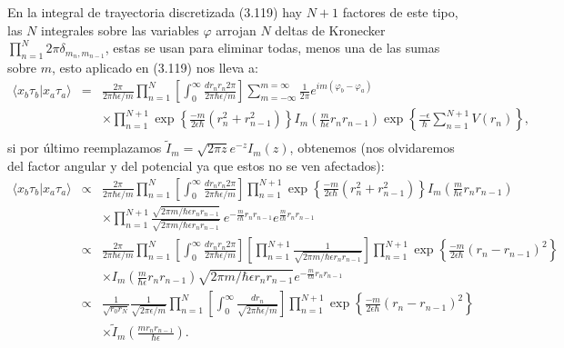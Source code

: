 En la integral de trayectoria discretizada (3.119) hay $N+1$ factores de este tipo, las $N$ integrales sobre las variables $\varphi$ arrojan $N$ deltas de Kronecker $\prod_{n=1}^{N}2\pi\delta_{m_{n},m_{n-1}}$, estas se usan para eliminar todas, menos una de las sumas sobre $m$, esto aplicado en (3.119) nos lleva a: 
\begin{eqnarray}
\nonumber \langle x_{b}\tau_{b}|x_{a}\tau_{a}\rangle &=&\frac{2\pi}{2\pi\hbar\epsilon/m}\prod_{n=1}^{N}\left[\int_{0}^{\infty}\frac{dr_{n}r_{n}2\pi}{2\pi\hbar\epsilon/m}\right]\sum_{m=-\infty}^{m=\infty}\frac{1}{2\pi}e^{im(\varphi_{b}-\varphi_{a})}\\
\nonumber && \times \prod_{n=1}^{N+1}\exp\left\{ \frac{-m}{2\epsilon\hbar}(r_{n}^{2}+r_{n-1}^{2})\right\} I_{m}\left(\frac{m}{\hbar\epsilon}r_{n}r_{n-1}\right)\exp\left\{ \frac{-\epsilon}{\hbar}\sum_{n=1}^{N+1}V(r_{n})\right\},\\ 
\end{eqnarray}
si por último reemplazamos $\tilde{I}_m=\sqrt{2\pi z}e^{-z}I_m(z)$, obtenemos (nos olvidaremos del factor angular y del potencial ya que estos no se ven afectados):
\begin{eqnarray}
\nonumber \langle x_{b}\tau_{b}|x_{a}\tau_{a}\rangle &\propto &\frac{2\pi}{2\pi\hbar\epsilon/m}\prod_{n=1}^{N}\left[\int_{0}^{\infty}\frac{dr_{n}r_{n}2\pi}{2\pi\hbar\epsilon/m}\right]\prod_{n=1}^{N+1}\exp\left\{ \frac{-m}{2\epsilon\hbar}(r_{n}^{2}+r_{n-1}^{2})\right\} I_{m}\left(\frac{m}{\hbar\epsilon}r_{n}r_{n-1}\right)\\
\nonumber &&\times \prod_{n=1}^{N+1}\frac{\sqrt{2\pi m/\hbar\epsilon r_{n}r_{n-1}}}{\sqrt{2\pi m/\hbar\epsilon r_{n}r_{n-1}}}\ e^{-\frac{m}{\epsilon\hbar}r_{n}r_{n-1}}e^{\frac{m}{\epsilon\hbar}r_{n}r_{n-1}}\\
\nonumber &\propto &\frac{2\pi}{2\pi\hbar\epsilon/m}\prod_{n=1}^{N}\left[\int_{0}^{\infty}\frac{dr_{n}r_{n}2\pi}{2\pi\hbar\epsilon/m}\right]\left[\prod_{n=1}^{N+1}\frac{1}{\sqrt{2\pi m/\hbar\epsilon r_{n}r_{n-1}}}\right]\prod_{n=1}^{N+1}\exp\left\{ \frac{-m}{2\epsilon\hbar}(r_{n}-r_{n-1})^{2}\right\} \\ 
\nonumber &&\times I_{m}\left(\frac{m}{\hbar\epsilon}r_{n}r_{n-1}\right)\sqrt{2\pi m/\hbar\epsilon r_{n}r_{n-1}}e^{-\frac{m}{\epsilon\hbar}r_{n}r_{n-1}}\\
\nonumber &\propto & \frac{1}{\sqrt{r_{0}r_{N}}}\frac{1}{\sqrt{2\pi\epsilon /m}}\prod_{n=1}^{N}\left[\int_{0}^{\infty}\frac{dr_{n}}{\sqrt{2\pi\hbar\epsilon/m}}\right]\prod_{n=1}^{N+1}\exp\left\{ \frac{-m}{2\epsilon\hbar}(r_{n}-r_{n-1})^{2}\right\}\\
&& \times \tilde{I}_{m}\left(\frac{mr_{n}r_{n-1}}{\hbar\epsilon}\right). 
\end{eqnarray}

